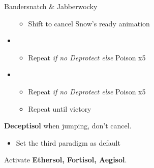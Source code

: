 \begin{battle}[0:55]{Bandersnatch \& Jabberwocky}
\begin{itemize}
\begin{itemize}
				      \item Shift to cancel Snow's ready animation
			      \end{itemize}
			\item \fifth
			      \begin{itemize}
				      \item Repeat \textit{if no Deprotect else } Poison x5
			      \end{itemize}
			\item \second
			      \begin{itemize}
				      \item Repeat \textit{if no Deprotect else }Poison x5
				      \item Repeat until victory
			      \end{itemize}
		\end{itemize}
	\end{battle}
	\textbf{Deceptisol} when jumping, don't cancel.

	\begin{menu}
		\begin{itemize}
			\paradigm
			\begin{itemize}
				\item Set the third paradigm as default
			\end{itemize}
		\end{itemize}
	\end{menu}
	
	Activate \textbf{Ethersol, Fortisol, Aegisol}.
	\vfill

	\renewcommand{\second}{[2] Devastation (\sab/\com/\com)}
	\renewcommand{\fifth}{[5] Smart Bomb (\sab/\rav/\rav)}
	\renewcommand{\sixth}{[6] Tri-Disaster (\rav/\rav/\rav)}
	\renewcommand{\third}{[3] Premeditation (\sab/\sen/\syn)}
	\renewcommand{\first}{[1] Tireless Charge (\med/\com/\com)}

